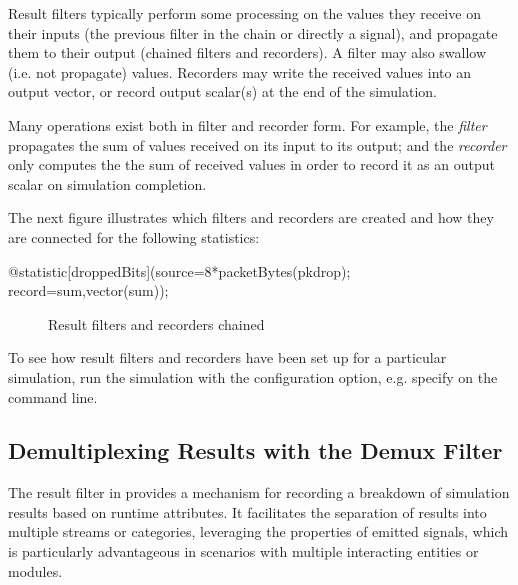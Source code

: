 Result filters typically perform some processing on the values they receive
on their inputs (the previous filter in the chain or directly a signal),
and propagate them to their output (chained filters and recorders). A
filter may also swallow (i.e. not propagate) values. Recorders may write
the received values into an output vector, or record output scalar(s)
at the end of the simulation.

Many operations exist both in filter and recorder form. For example, the
 \textit{filter} propagates the sum of values received on its
input to its output; and the  \textit{recorder} only computes the
the sum of received values in order to record it as an output scalar on
simulation completion.

The next figure illustrates which filters and recorders are created and how
they are connected for the following statistics:

\begin{ned}
@statistic[droppedBits](source=8*packetBytes(pkdrop); record=sum,vector(sum));
\end{ned}

\begin{figure}[htbp]
  \begin{center}
    
    \caption{Result filters and recorders chained}
  \end{center}
\end{figure}

\begin{hint}
To see how result filters and recorders have been set up for a particular
simulation, run the simulation with the 
configuration option, e.g. specify 
on the command line.
\end{hint}


\subsection{Demultiplexing Results with the Demux Filter}
\label{sec:simple-modules:demux-filter}

The  result filter in {\omnetpp} provides a mechanism for
recording a breakdown of simulation results based on runtime attributes. It
facilitates the separation of results into multiple streams or categories,
leveraging the properties of emitted signals, which is particularly advantageous
in scenarios with multiple interacting entities or modules.

